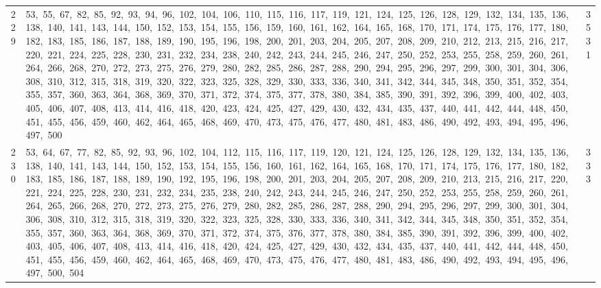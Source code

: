 \begin{longtable}{c|p{}|r}
229 & 53,\ 55,\ 67,\ 82,\ 85,\ 92,\ 93,\ 94,\ 96,\ 102,\ 104,\ 106,\ 110,\ 115,\ 116,\ 117,\ 119,\ 121,\ 124,\ 125,\ 126,\ 128,\ 129,\ 132,\ 134,\ 135,\ 136,\ 138,\ 140,\ 141,\ 143,\ 144,\ 150,\ 152,\ 153,\ 154,\ 155,\ 156,\ 159,\ 160,\ 161,\ 162,\ 164,\ 165,\ 168,\ 170,\ 171,\ 174,\ 175,\ 176,\ 177,\ 180,\ 182,\ 183,\ 185,\ 186,\ 187,\ 188,\ 189,\ 190,\ 195,\ 196,\ 198,\ 200,\ 201,\ 203,\ 204,\ 205,\ 207,\ 208,\ 209,\ 210,\ 212,\ 213,\ 215,\ 216,\ 217,\ 220,\ 221,\ 224,\ 225,\ 228,\ 230,\ 231,\ 232,\ 234,\ 238,\ 240,\ 242,\ 243,\ 244,\ 245,\ 246,\ 247,\ 250,\ 252,\ 253,\ 255,\ 258,\ 259,\ 260,\ 261,\ 264,\ 266,\ 268,\ 270,\ 272,\ 273,\ 275,\ 276,\ 279,\ 280,\ 282,\ 285,\ 286,\ 287,\ 288,\ 290,\ 294,\ 295,\ 296,\ 297,\ 299,\ 300,\ 301,\ 304,\ 306,\ 308,\ 310,\ 312,\ 315,\ 318,\ 319,\ 320,\ 322,\ 323,\ 325,\ 328,\ 329,\ 330,\ 333,\ 336,\ 340,\ 341,\ 342,\ 344,\ 345,\ 348,\ 350,\ 351,\ 352,\ 354,\ 355,\ 357,\ 360,\ 363,\ 364,\ 368,\ 369,\ 370,\ 371,\ 372,\ 374,\ 375,\ 377,\ 378,\ 380,\ 384,\ 385,\ 390,\ 391,\ 392,\ 396,\ 399,\ 400,\ 402,\ 403,\ 405,\ 406,\ 407,\ 408,\ 413,\ 414,\ 416,\ 418,\ 420,\ 423,\ 424,\ 425,\ 427,\ 429,\ 430,\ 432,\ 434,\ 435,\ 437,\ 440,\ 441,\ 442,\ 444,\ 448,\ 450,\ 451,\ 455,\ 456,\ 459,\ 460,\ 462,\ 464,\ 465,\ 468,\ 469,\ 470,\ 473,\ 475,\ 476,\ 477,\ 480,\ 481,\ 483,\ 486,\ 490,\ 492,\ 493,\ 494,\ 495,\ 496,\ 497,\ 500 & 3531 \\
230 & 53,\ 64,\ 67,\ 77,\ 82,\ 85,\ 92,\ 93,\ 96,\ 102,\ 104,\ 112,\ 115,\ 116,\ 117,\ 119,\ 120,\ 121,\ 124,\ 125,\ 126,\ 128,\ 129,\ 132,\ 134,\ 135,\ 136,\ 138,\ 140,\ 141,\ 143,\ 144,\ 150,\ 152,\ 153,\ 154,\ 155,\ 156,\ 160,\ 161,\ 162,\ 164,\ 165,\ 168,\ 170,\ 171,\ 174,\ 175,\ 176,\ 177,\ 180,\ 182,\ 183,\ 185,\ 186,\ 187,\ 188,\ 189,\ 190,\ 192,\ 195,\ 196,\ 198,\ 200,\ 201,\ 203,\ 204,\ 205,\ 207,\ 208,\ 209,\ 210,\ 213,\ 215,\ 216,\ 217,\ 220,\ 221,\ 224,\ 225,\ 228,\ 230,\ 231,\ 232,\ 234,\ 235,\ 238,\ 240,\ 242,\ 243,\ 244,\ 245,\ 246,\ 247,\ 250,\ 252,\ 253,\ 255,\ 258,\ 259,\ 260,\ 261,\ 264,\ 265,\ 266,\ 268,\ 270,\ 272,\ 273,\ 275,\ 276,\ 279,\ 280,\ 282,\ 285,\ 286,\ 287,\ 288,\ 290,\ 294,\ 295,\ 296,\ 297,\ 299,\ 300,\ 301,\ 304,\ 306,\ 308,\ 310,\ 312,\ 315,\ 318,\ 319,\ 320,\ 322,\ 323,\ 325,\ 328,\ 330,\ 333,\ 336,\ 340,\ 341,\ 342,\ 344,\ 345,\ 348,\ 350,\ 351,\ 352,\ 354,\ 355,\ 357,\ 360,\ 363,\ 364,\ 368,\ 369,\ 370,\ 371,\ 372,\ 374,\ 375,\ 376,\ 377,\ 378,\ 380,\ 384,\ 385,\ 390,\ 391,\ 392,\ 396,\ 399,\ 400,\ 402,\ 403,\ 405,\ 406,\ 407,\ 408,\ 413,\ 414,\ 416,\ 418,\ 420,\ 424,\ 425,\ 427,\ 429,\ 430,\ 432,\ 434,\ 435,\ 437,\ 440,\ 441,\ 442,\ 444,\ 448,\ 450,\ 451,\ 455,\ 456,\ 459,\ 460,\ 462,\ 464,\ 465,\ 468,\ 469,\ 470,\ 473,\ 475,\ 476,\ 477,\ 480,\ 481,\ 483,\ 486,\ 490,\ 492,\ 493,\ 494,\ 495,\ 496,\ 497,\ 500,\ 504 & 333 \\

\end{longtable}
